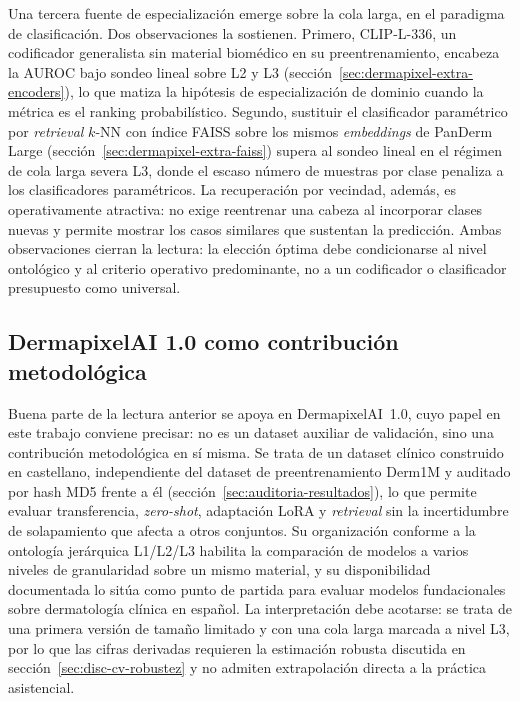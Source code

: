 Una tercera fuente de especialización emerge sobre la cola larga, en
el paradigma de clasificación. Dos observaciones la sostienen.
Primero, CLIP-L-336, un codificador generalista sin material
biomédico en su preentrenamiento, encabeza la AUROC bajo sondeo lineal
sobre L2 y L3 (sección~\ref{sec:dermapixel-extra-encoders}), lo que
matiza la hipótesis de especialización de dominio cuando la métrica es
el ranking probabilístico. Segundo, sustituir el clasificador
paramétrico por \emph{retrieval} $k$-NN con índice FAISS sobre los
mismos \emph{embeddings} de PanDerm Large
(sección~\ref{sec:dermapixel-extra-faiss}) supera al sondeo lineal en
el régimen de cola larga severa L3, donde el escaso número de muestras
por clase penaliza a los clasificadores paramétricos. La recuperación
por vecindad, además, es operativamente atractiva: no exige reentrenar
una cabeza al incorporar clases nuevas y permite mostrar los casos
similares que sustentan la predicción. Ambas observaciones cierran la
lectura: la elección óptima debe condicionarse al nivel ontológico y
al criterio operativo predominante, no a un codificador o clasificador
presupuesto como universal.

\subsection{DermapixelAI 1.0 como contribución metodológica}
\label{sec:disc-dermapixel-contrib}

Buena parte de la lectura anterior se apoya en DermapixelAI~1.0, cuyo
papel en este trabajo conviene precisar: no es un dataset auxiliar de
validación, sino una contribución metodológica en sí misma. Se trata de
un dataset clínico construido en castellano, independiente del dataset de
preentrenamiento Derm1M y auditado por hash MD5 frente a él
(sección~\ref{sec:auditoria-resultados}), lo que permite evaluar
transferencia, \emph{zero-shot}, adaptación LoRA y \emph{retrieval} sin la
incertidumbre de solapamiento que afecta a otros conjuntos. Su
organización conforme a la ontología jerárquica L1/L2/L3 habilita la
comparación de modelos a varios niveles de granularidad sobre un mismo
material, y su disponibilidad documentada lo sitúa como punto de partida
para evaluar modelos fundacionales sobre dermatología clínica en español.
La interpretación debe acotarse: se trata de una primera versión de
tamaño limitado y con una cola larga marcada a nivel L3, por lo que las
cifras derivadas requieren la estimación robusta discutida en
sección~\ref{sec:disc-cv-robustez} y no admiten extrapolación directa a
la práctica asistencial.

